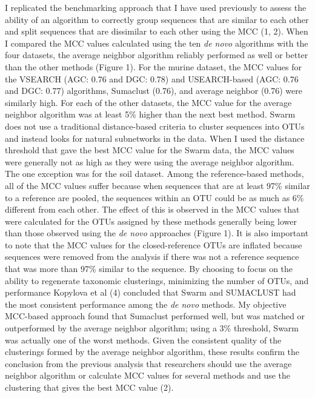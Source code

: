\documentclass[11pt,]{article}
\begin{document}
I replicated the benchmarking approach that I have used previously to
assess the ability of an algorithm to correctly group sequences that are
similar to each other and split sequences that are dissimilar to each
other using the MCC (1, 2). When I compared the MCC values calculated
using the ten \emph{de novo} algorithms with the four datasets, the
average neighbor algorithm reliably performed as well or better than the
other methods (Figure 1). For the murine dataset, the MCC values for the
VSEARCH (AGC: 0.76 and DGC: 0.78) and USEARCH-based (AGC: 0.76 and DGC:
0.77) algorithms, Sumaclust (0.76), and average neighbor (0.76) were
similarly high. For each of the other datasets, the MCC value for the
average neighbor algorithm was at least 5\% higher than the next best
method. Swarm does not use a traditional distance-based criteria to
cluster sequences into OTUs and instead looks for natural subnetworks in
the data. When I used the distance threshold that gave the best MCC
value for the Swarm data, the MCC values were generally not as high as
they were using the average neighbor algorithm. The one exception was
for the soil dataset. Among the reference-based methods, all of the MCC
values suffer because when sequences that are at least 97\% similar to a
reference are pooled, the sequences within an OTU could be as much as
6\% different from each other. The effect of this is observed in the MCC
values that were calculated for the OTUs assigned by these methods
generally being lower than those observed using the \emph{de novo}
approaches (Figure 1). It is also important to note that the MCC values
for the closed-reference OTUs are inflated because sequences were
removed from the analysis if there was not a reference sequence that was
more than 97\% similar to the sequence. By choosing to focus on the
ability to regenerate taxonomic clusterings, minimizing the number of
OTUs, and performance Kopylova et al (4) concluded that Swarm and
SUMACLUST had the most consistent performance among the \emph{de novo}
methods. My objective MCC-based approach found that Sumaclust performed
well, but was matched or outperformed by the average neighbor algorithm;
using a 3\% threshold, Swarm was actually one of the worst methods.
Given the consistent quality of the clusterings formed by the average
neighbor algorithm, these results confirm the conclusion from the
previous analysis that researchers should use the average neighbor
algorithm or calculate MCC values for several methods and use the
clustering that gives the best MCC value (2).
\end{document}
